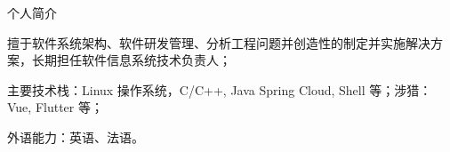\documentclass{resume} %
\begin{document}
\begin{rSection}{个人简介}
  \item 擅于软件系统架构、软件研发管理、分析工程问题并创造性的制定并实施解决方案，长期担任软件信息系统技术负责人；
  \item 主要技术栈：Linux 操作系统，C/C++, Java Spring Cloud, Shell 等；涉猎：Vue, Flutter 等；
  \item 外语能力：英语、法语。
\end{rSection}





\end{document}
